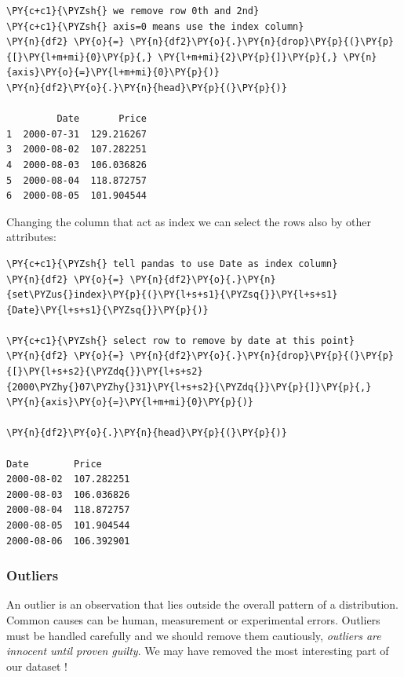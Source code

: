 \begin{tcolorbox}[breakable, size=fbox, boxrule=1pt, pad at break*=1mm,colback=cellbackground, colframe=cellborder]
\begin{Verbatim}[commandchars=\\\{\}]
\PY{c+c1}{\PYZsh{} we remove row 0th and 2nd}
\PY{c+c1}{\PYZsh{} axis=0 means use the index column}
\PY{n}{df2} \PY{o}{=} \PY{n}{df2}\PY{o}{.}\PY{n}{drop}\PY{p}{(}\PY{p}{[}\PY{l+m+mi}{0}\PY{p}{,} \PY{l+m+mi}{2}\PY{p}{]}\PY{p}{,} \PY{n}{axis}\PY{o}{=}\PY{l+m+mi}{0}\PY{p}{)}
\PY{n}{df2}\PY{o}{.}\PY{n}{head}\PY{p}{(}\PY{p}{)}

         Date       Price
1  2000-07-31  129.216267
3  2000-08-02  107.282251
4  2000-08-03  106.036826
5  2000-08-04  118.872757
6  2000-08-05  101.904544
\end{Verbatim}
\end{tcolorbox}
        
Changing the column that act as index we can select the rows also by other attributes:

\begin{tcolorbox}[breakable, size=fbox, boxrule=1pt, pad at break*=1mm,colback=cellbackground, colframe=cellborder]
\begin{Verbatim}[commandchars=\\\{\}]
\PY{c+c1}{\PYZsh{} tell pandas to use Date as index column}
\PY{n}{df2} \PY{o}{=} \PY{n}{df2}\PY{o}{.}\PY{n}{set\PYZus{}index}\PY{p}{(}\PY{l+s+s1}{\PYZsq{}}\PY{l+s+s1}{Date}\PY{l+s+s1}{\PYZsq{}}\PY{p}{)}

\PY{c+c1}{\PYZsh{} select row to remove by date at this point}
\PY{n}{df2} \PY{o}{=} \PY{n}{df2}\PY{o}{.}\PY{n}{drop}\PY{p}{(}\PY{p}{[}\PY{l+s+s2}{\PYZdq{}}\PY{l+s+s2}{2000\PYZhy{}07\PYZhy{}31}\PY{l+s+s2}{\PYZdq{}}\PY{p}{]}\PY{p}{,} \PY{n}{axis}\PY{o}{=}\PY{l+m+mi}{0}\PY{p}{)}

\PY{n}{df2}\PY{o}{.}\PY{n}{head}\PY{p}{(}\PY{p}{)}

Date        Price
2000-08-02  107.282251
2000-08-03  106.036826
2000-08-04  118.872757
2000-08-05  101.904544
2000-08-06  106.392901
\end{Verbatim}
\end{tcolorbox}
        
\subsubsection{Outliers}\label{outliers}

An outlier is an observation that lies outside the overall pattern of a distribution. Common causes can be human, measurement or experimental errors. Outliers must be handled carefully and we should remove them cautiously, \emph{outliers are innocent until proven guilty}. We may have removed the most interesting part of our dataset !

